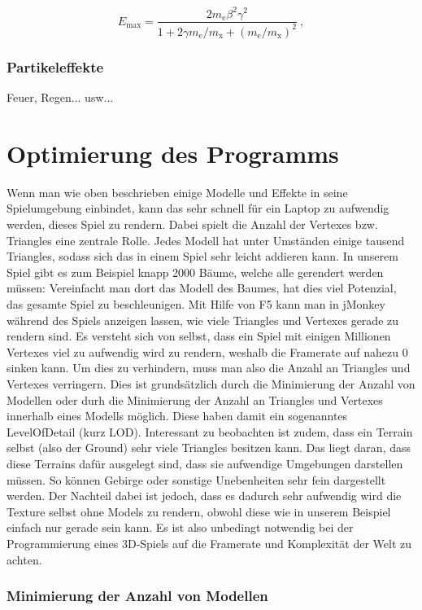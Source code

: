\[
E_{\textrm{max}} =\frac{2 m_{\textrm{e}} \beta^2\gamma^2 }{1 +
	2\gamma m_{\textrm{e}}/m_{\textrm{x}} + \left ( m_{\textrm{e}}
	/m_{\textrm{x}}\right)^2}\ ,
\]

\subsubsection{Partikeleffekte}
Feuer, Regen... usw...


\section{Optimierung des Programms}\label{sec:optimizing}
Wenn man wie oben beschrieben einige Modelle und Effekte in seine Spielumgebung einbindet, kann das sehr schnell für ein Laptop zu aufwendig werden, dieses Spiel zu rendern. Dabei spielt die Anzahl der Vertexes bzw. Triangles eine zentrale Rolle. Jedes Modell hat unter Umständen einige tausend Triangles, sodass sich das in einem Spiel sehr leicht addieren kann. In unserem Spiel gibt es zum Beispiel knapp 2000 Bäume, welche alle gerendert werden müssen: Vereinfacht man dort das Modell des Baumes, hat dies viel Potenzial, das gesamte Spiel zu beschleunigen. Mit Hilfe von F5 kann man in jMonkey während des Spiels anzeigen lassen, wie viele Triangles und Vertexes gerade zu rendern sind. Es versteht sich von selbst, dass ein Spiel mit einigen Millionen Vertexes viel zu aufwendig wird zu rendern, weshalb die Framerate auf nahezu 0 sinken kann. Um dies zu verhindern, muss man also die Anzahl an Triangles und Vertexes verringern. Dies ist grundsätzlich durch die Minimierung der Anzahl von Modellen oder durh die Minimierung der Anzahl an Triangles und Vertexes innerhalb eines Modells möglich. Diese haben damit ein sogenanntes LevelOfDetail (kurz LOD). Interessant zu beobachten ist zudem, dass ein Terrain selbst (also der Ground) sehr viele Triangles besitzen kann. Das liegt daran, dass diese Terrains dafür ausgelegt sind, dass sie aufwendige Umgebungen darstellen müssen. So können Gebirge oder sonstige Unebenheiten sehr fein dargestellt werden. Der Nachteil dabei ist jedoch, dass es dadurch sehr aufwendig wird die Texture selbst ohne Models zu rendern, obwohl diese wie in unserem Beispiel einfach nur gerade sein kann. Es ist also unbedingt notwendig bei der Programmierung eines 3D-Spiels auf die Framerate und Komplexität der Welt zu achten.



\subsubsection{Minimierung der Anzahl von Modellen}

